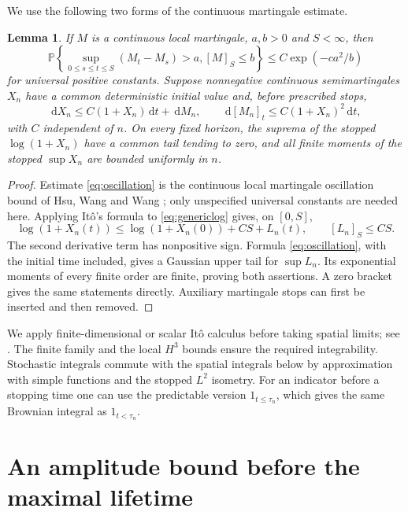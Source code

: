 \documentclass[11pt]{amsart}
\newtheorem{lemma}[theorem]{Lemma}
\theoremstyle{remark}
\numberwithin{equation}{section}
\newcommand{\PP}{\mathbb P}
\newcommand{\dd}{\,\mathrm d}
\begin{document}
We use the following two forms of the continuous martingale estimate.

\begin{lemma}\label{lem:martingale}
If $M$ is a continuous local martingale, $a,b>0$ and $S<\infty$, then
\begin{equation}\label{eq:oscillation}
 \PP\left\{\sup_{0\leq s\leq t\leq S}(M_t-M_s)>a,
                  [M]_S\leq b\right\}
 \leq C\exp(-ca^2/b)
\end{equation}
for universal positive constants. Suppose nonnegative continuous semimartingales
$X_n$ have a common deterministic initial value and, before prescribed stops,
\begin{equation}\label{eq:genericlog}
 \dd X_n\leq C(1+X_n)\dd t+\dd M_n,\qquad
 \dd[M_n]_t\leq C(1+X_n)^2\dd t,
\end{equation}
with $C$ independent of $n$. On every fixed horizon, the suprema of the stopped
$\log(1+X_n)$ have a common tail tending to zero, and all finite moments of
the stopped $\sup X_n$ are bounded uniformly in $n$.
\end{lemma}

\begin{proof}
Estimate \eqref{eq:oscillation} is the continuous local martingale oscillation
bound of Hsu, Wang and Wang \cite[Lemma 3.1, arXiv version 3]{HWW}; only unspecified universal
constants are needed here. Applying It\^o's formula to \eqref{eq:genericlog}
gives, on $[0,S]$,
\[
 \log(1+X_n(t))\leq\log(1+X_n(0))+CS+L_n(t),\qquad [L_n]_S\leq CS.
\]
The second derivative term has nonpositive sign. Formula
\eqref{eq:oscillation}, with the initial time included, gives a Gaussian
upper tail for $\sup L_n$. Its exponential moments of every finite order
are finite, proving both assertions. A zero bracket gives the same statements
directly. Auxiliary martingale stops can first be inserted and then removed.
\end{proof}

We apply finite-dimensional or scalar It\^o calculus before taking spatial
limits; see \cite[Theorem 2.4]{BVNVW}. The finite family and the local $H^3$
bounds ensure the required integrability. Stochastic integrals commute with
the spatial integrals below by approximation with simple functions and the
stopped $L^2$ isometry. For an indicator before a stopping time one can use
the predictable version $1_{t\leq\tau_n}$, which gives the same Brownian
integral as $1_{t<\tau_n}$.

\section{An amplitude bound before the maximal lifetime}\label{sec:amplitude}
\end{document}
